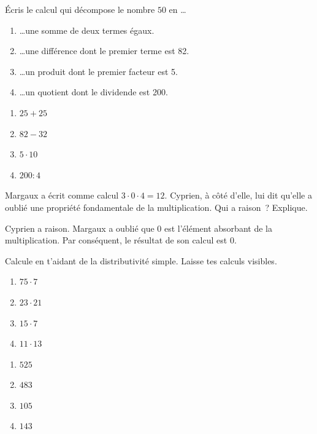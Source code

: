 \documentclass[../../syllabus_1.tex]{subfiles}
\begin{document}
\begin{exercise}
    Écris le calcul qui décompose le nombre \(50\) en  \dots
    \begin{enumerate}
        \item \dots une somme de deux termes égaux.
        \item \dots une différence dont le premier terme est 82.
        \item \dots un produit dont le premier facteur est 5.
        \item \dots un quotient dont le dividende est 200.
    \end{enumerate}
\end{exercise}
\begin{solution}
    \begin{enumerate}
        \item $25 + 25$
        \item $82 - 32$
        \item $5 \cdot 10$
        \item $200 : 4$
    \end{enumerate}
\end{solution}

\begin{exercise}
    Margaux a écrit comme calcul \og \(3 \cdot 0 \cdot 4 = 12\)\fg.
    Cyprien, à côté d'elle, lui dit qu'elle a oublié une propriété
    fondamentale de la multiplication. Qui a raison~? Explique.
\end{exercise}
\begin{solution}
    Cyprien a raison. Margaux a oublié que 0 est l'élément absorbant de la multiplication. Par conséquent, le résultat de son calcul est 0.
\end{solution}

\begin{exercise}
    Calcule en t'aidant de la distributivité simple. Laisse tes calculs visibles.
    \begin{enumerate}[cols=4]
        \item \(75 \cdot 7\)
        \item \(23 \cdot 21 \)
        \item $15 \cdot 7$
        \item $11 \cdot 13$
    \end{enumerate}
\end{exercise}
\begin{solution}
    \begin{enumerate}
        \item $525$
        \item $483$
        \item $105$
        \item $143$
    \end{enumerate}
\end{solution}
\end{document}
